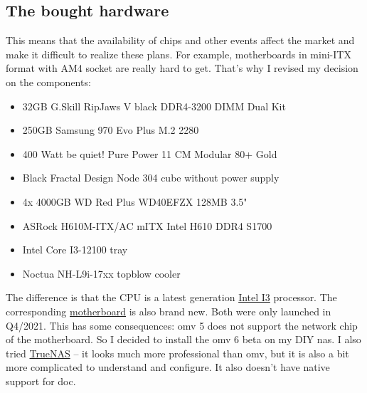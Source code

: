 \subsection{The bought hardware}

\begin{figure}[H]
    \centering
    \begin{Huge}
    \end{Huge}
\end{figure}

This means that the availability of chips and other events affect the market
and make it difficult to realize these plans. For example, motherboards in
mini-ITX format with AM4 socket are really hard to get. That's why I revised
my decision on the components:

\begin{itemize}
    \item 32GB G.Skill RipJaws V black DDR4-3200 DIMM Dual Kit
    \item 250GB Samsung 970 Evo Plus M.2 2280
    \item 400 Watt be quiet! Pure Power 11 CM Modular 80+ Gold
    \item Black Fractal Design Node 304 cube without power supply
    \item 4x 4000GB WD Red Plus WD40EFZX 128MB 3.5"
    \item ASRock H610M-ITX/AC mITX Intel H610 DDR4 S1700
    \item Intel Core I3-12100 tray
    \item Noctua NH-L9i-17xx topblow cooler
\end{itemize}

The difference is that the CPU is a latest generation
\href{https://www.intel.com/content/www/us/en/products/sku/134584/intel-core-i312100-processor-12m-cache-up-to-4-30-ghz/specifications.html?wapkw=12100}{Intel I3}
processor. The corresponding
\href{https://www.asrock.com/MB/Intel/H610M-ITXac/index.de.asp}{motherboard}
is also brand new. Both were only launched in Q4/2021. This has some
consequences: \gls{omv} 5 does not support the network chip of the motherboard.
So I decided to install the \gls{omv} 6 beta on my DIY \gls{nas}. I also tried
\href{https://www.truenas.com/}{TrueNAS} -- it looks much more professional
than \gls{omv}, but it is also a bit more complicated to understand and
configure. It also doesn't have native support for \gls{doc}.
